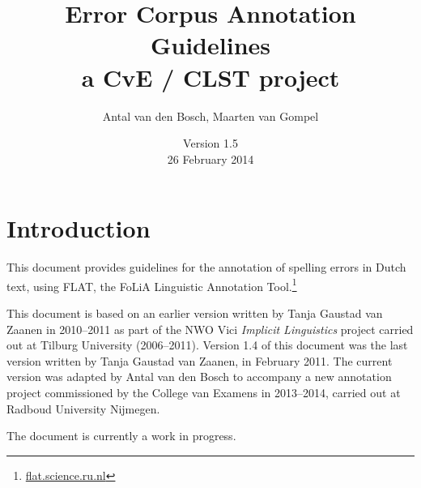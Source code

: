 \documentclass[a4paper,11pt]{article}
\title{Error Corpus Annotation Guidelines \\ a CvE / CLST project}
\author{Antal van den Bosch, Maarten van Gompel}
\date{Version 1.5 \\ 26 February 2014}
\begin{document}
\maketitle

\newpage

\section{Introduction}

This document provides guidelines for the annotation of spelling
errors in Dutch text, using FLAT, the FoLiA Linguistic Annotation
Tool.\footnote{\url{flat.science.ru.nl}}


This document is based on an earlier version written by Tanja Gaustad
van Zaanen in 2010--2011 as part of the NWO Vici {\em Implicit
  Linguistics} project carried out at Tilburg University
(2006--2011). Version 1.4 of this document was the last version
written by Tanja Gaustad van Zaanen, in February 2011. The current
version was adapted by Antal van den Bosch to accompany a new
annotation project commissioned by the College van Examens in
2013--2014, carried out at Radboud University Nijmegen.

The document is currently a work in progress.



\end{document}
